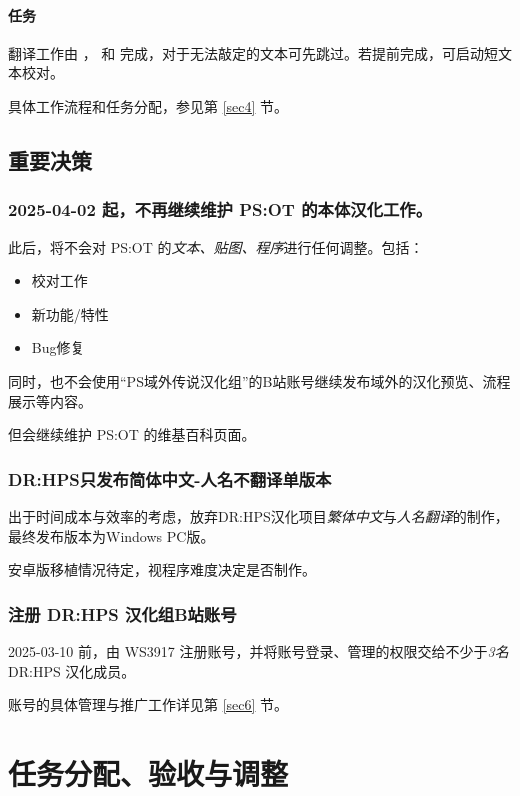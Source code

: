 \documentclass[UTF8, a4paper, 12pt]{ctexart}
\begin{document}
\paragraph{任务} 翻译工作由 ， 和  完成，对于无法敲定的文本可先跳过。若提前完成，可启动短文本校对。

具体工作流程和任务分配，参见第 \ref{sec4} 节。

\subsection{重要决策}
\subsubsection{2025-04-02 起，不再继续维护 PS:OT 的本体汉化工作。}
此后，将不会对 PS:OT 的\emph{文本、贴图、程序}进行任何调整。包括：
\begin{itemize}
    \item 校对工作
    \item 新功能/特性
    \item Bug修复
\end{itemize}

同时，也不会使用“PS域外传说汉化组”的B站账号继续发布域外的汉化预览、流程展示等内容。

但会继续维护 PS:OT 的维基百科页面。

\subsubsection{DR:HPS只发布简体中文-人名不翻译单版本}

出于时间成本与效率的考虑，放弃DR:HPS汉化项目\emph{繁体中文}与\emph{人名翻译}的制作，最终发布版本为Windows PC版。

安卓版移植情况待定，视程序难度决定是否制作。

\subsubsection{注册 DR:HPS 汉化组B站账号}

2025-03-10 前，由 WS3917 注册账号，并将账号登录、管理的权限交给不少于\emph{3名} DR:HPS 汉化成员。

账号的具体管理与推广工作详见第 \ref{sec6} 节。

\newpage
\section{任务分配、验收与调整}\label{sec2}
\end{document}
